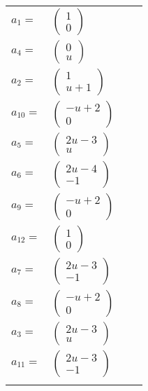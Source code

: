 \documentclass[1p]{elsarticle_modified}
\theoremstyle{definition}
\begin{document}
\begin{tabular}{m{7pt} m{180pt} m{7pt} m{180pt} }
\flushright $a_{1}=$&$\begin{pmatrix}1\\0\end{pmatrix}$ \\
\flushright $a_{4}=$&$\begin{pmatrix}0\\u\end{pmatrix}$ \\
\flushright $a_{2}=$&$\begin{pmatrix}1\\u+1\end{pmatrix}$ \\
\flushright $a_{10}=$&$\begin{pmatrix}- u+2\\0\end{pmatrix}$ \\
\flushright $a_{5}=$&$\begin{pmatrix}2 u-3\\u\end{pmatrix}$ \\
\flushright $a_{6}=$&$\begin{pmatrix}2 u-4\\-1\end{pmatrix}$ \\
\flushright $a_{9}=$&$\begin{pmatrix}- u+2\\0\end{pmatrix}$ \\
\flushright $a_{12}=$&$\begin{pmatrix}1\\0\end{pmatrix}$ \\
\flushright $a_{7}=$&$\begin{pmatrix}2 u-3\\-1\end{pmatrix}$ \\
\flushright $a_{8}=$&$\begin{pmatrix}- u+2\\0\end{pmatrix}$ \\
\flushright $a_{3}=$&$\begin{pmatrix}2 u-3\\u\end{pmatrix}$ \\
\flushright $a_{11}=$&$\begin{pmatrix}2 u-3\\-1\end{pmatrix}$\\&\end{tabular}
\end{document}
